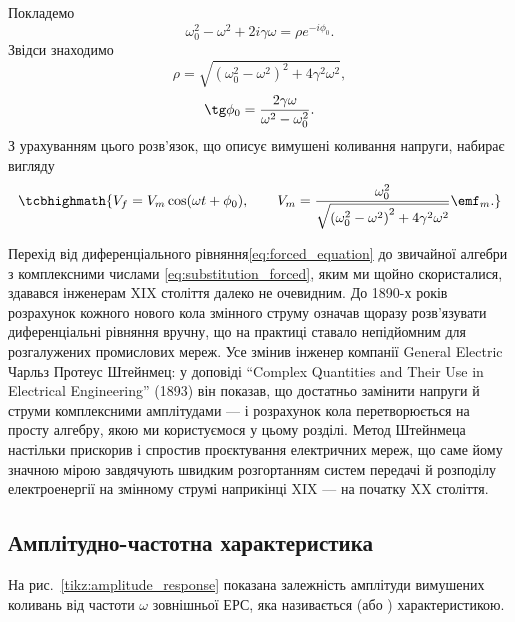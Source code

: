Покладемо
\begin{equation}\label{eq:polar_form}
	\omega_0^2 - \omega^2 + 2i\gamma\omega = \rho e^{-i\phi_0}.
\end{equation}
Звідси знаходимо
\begin{equation}\label{eq:rho_phi}
	\rho = \sqrt{\left(\omega_0^2 - \omega^2\right)^2 + 4\gamma^2\omega^2},
\end{equation}
\begin{equation}\label{eq:tg_phi0}
	\tg\phi_0 = \frac{2\gamma\omega}{\omega^2 - \omega_0^2}.
\end{equation}
З урахуванням цього розв'язок, що описує вимушені коливання напруги, набирає вигляду
\begin{equation}\label{eq:forced_voltage}
	\tcbhighmath{
		V_f = V_m \cos(\omega t + \phi_0), \qquad
		V_m = \frac{\omega_0^2}{\sqrt{\left(\omega_0^2 - \omega^2\right)^2 + 4\gamma^2\omega^2}}\emf_m.
	}
\end{equation}

\begin{Historical}
	Перехід від диференціального рівняння\eqref{eq:forced_equation} до звичайної алгебри з комплексними числами \eqref{eq:substitution_forced}, яким ми щойно скористалися, здавався інженерам XIX століття далеко не очевидним. До 1890-х років розрахунок кожного нового кола змінного струму означав щоразу розв'язувати диференціальні рівняння вручну, що на практиці ставало непідйомним для розгалужених промислових мереж. Усе змінив інженер компанії General Electric Чарльз Протеус Штейнмец: у доповіді \enquote{Complex Quantities and Their Use in Electrical Engineering} (1893) він показав, що достатньо замінити напруги й струми комплексними амплітудами --- і розрахунок кола перетворюється на просту алгебру, якою ми користуємося у цьому розділі. Метод Штейнмеца настільки прискорив і спростив проєктування електричних мереж, що саме йому значною мірою завдячують швидким розгортанням систем передачі й розподілу електроенергії на змінному струмі наприкінці XIX --- на початку XX століття.
\end{Historical}

\subsection*{Амплітудно-частотна характеристика}

На рис.~\ref{tikz:amplitude_response} показана залежність амплітуди вимушених коливань від частоти $\omega$ зовнішньої ЕРС, яка називається  (або ) характеристикою.

